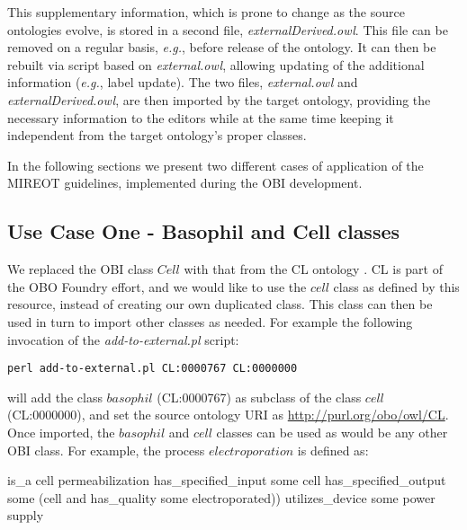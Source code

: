 \documentclass{ao2e}%
\begin{document}
This supplementary information, which is prone to change as the source ontologies evolve, is stored in a second file, \emph{externalDerived.owl}.
This file can be removed on a regular basis, \emph{e.g.}, before release of the ontology.
It can then be rebuilt via script based on \emph{external.owl}, allowing updating of the additional information (\emph{e.g.}, label update).
The two files, \emph{external.owl} and \emph{externalDerived.owl}, are then imported by the target ontology, providing the necessary information to the editors while at the same time keeping it independent from the target ontology's proper classes.

In the following sections we present two different cases of application of the \ac{MIREOT} guidelines, implemented during the \ac{OBI} development.


\subsection*{Use Case One - Basophil and Cell classes}

We replaced the \ac{OBI} class $Cell$ with that from the \ac{CL} ontology \cite{CL}. 
\ac{CL} is part of the \ac{OBO} Foundry effort, and we would like to use the $cell$ class as defined by this resource, instead of creating our own duplicated class.
This class can then be used in turn to import other classes as needed.
For example the following invocation of the \emph{add-to-external.pl} script:

\begin{footnotesize}
\begin{verbatim}
perl add-to-external.pl CL:0000767 CL:0000000 
\end{verbatim}
\end{footnotesize}

will add the class $basophil$ (CL:0000767) as subclass of the class $cell$  (CL:0000000), and set the source ontology URI as \url{http://purl.org/obo/owl/CL}.
Once imported, the $basophil$ and $cell$ classes can be used as would be any other OBI class. For example, the process $electroporation$ is defined as:

\begin{footnotesize}
\begin{verbatimtab}
is_a cell permeabilization
has_specified_input some cell
has_specified_output some 
   (cell and has_quality some electroporated))
utilizes_device some power supply
\end{verbatimtab}
\end{footnotesize}
\end{document}

